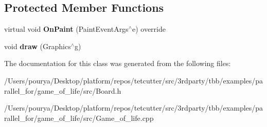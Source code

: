 \subsection*{Protected Member Functions}
\begin{DoxyCompactItemize}
\item 
\hypertarget{classBoard_adc8b41bd7133264970670a351c4a679d}{}virtual void {\bfseries On\+Paint} (Paint\+Event\+Args$^\wedge$e) override\label{classBoard_adc8b41bd7133264970670a351c4a679d}

\item 
\hypertarget{classBoard_a747b46d8d879e501345ac3726878c919}{}void {\bfseries draw} (Graphics$^\wedge$g)\label{classBoard_a747b46d8d879e501345ac3726878c919}

\end{DoxyCompactItemize}


The documentation for this class was generated from the following files\+:\begin{DoxyCompactItemize}
\item 
/\+Users/pourya/\+Desktop/platform/repos/tetcutter/src/3rdparty/tbb/examples/parallel\+\_\+for/game\+\_\+of\+\_\+life/src/Board.\+h\item 
/\+Users/pourya/\+Desktop/platform/repos/tetcutter/src/3rdparty/tbb/examples/parallel\+\_\+for/game\+\_\+of\+\_\+life/src/Game\+\_\+of\+\_\+life.\+cpp\end{DoxyCompactItemize}
